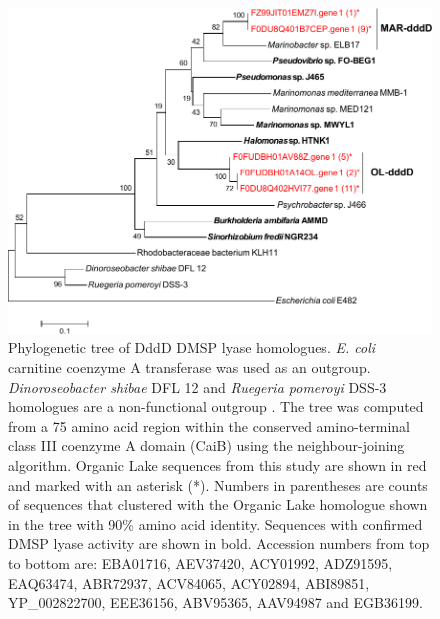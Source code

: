 \begin{figure}
\includegraphics{orglake_figures/dddD_tree.pdf}
\caption[Phylogenetic tree of DddD DMSP lyase homologues]{Phylogenetic tree of DddD DMSP lyase homologues. \emph{E. coli} carnitine coenzyme A transferase was used as an outgroup. \emph{Dinoroseobacter shibae} DFL 12 and \emph{Ruegeria pomeroyi} DSS-3 homologues are a non-functional outgroup \cite{Todd2011}. The tree was computed from a 75 amino acid region within the conserved amino-terminal class III coenzyme A domain (CaiB) using the neighbour-joining algorithm. Organic Lake sequences from this study are shown in red and marked with an asterisk (*). Numbers in parentheses are counts of sequences that clustered with the Organic Lake homologue shown in the tree with 90\% amino acid identity. Sequences with confirmed DMSP lyase activity are shown in bold. Accession numbers from top to bottom are: EBA01716, AEV37420, ACY01992, ADZ91595, EAQ63474, ABR72937, ACV84065, ACY02894, ABI89851, YP\_002822700, EEE36156, ABV95365, AAV94987 and EGB36199.}
\label{fig:dddD_tree}

\end{figure}
